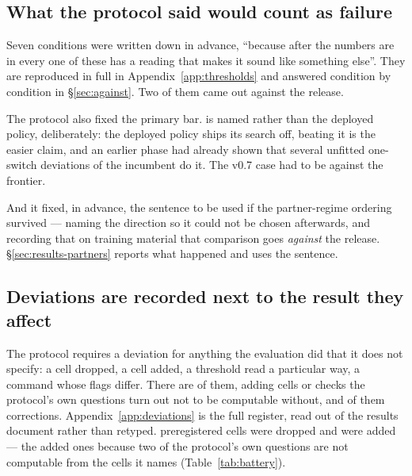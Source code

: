 \subsection{What the protocol said would count as failure}
\label{sec:protocol-failure}

Seven conditions were written down in advance, ``because after the numbers are in every one of these
has a reading that makes it sound like something else''. They are reproduced in full in
Appendix~\ref{app:thresholds} and answered condition by condition in \S\ref{sec:against}. Two of them
came out against the release.

The protocol also fixed the primary bar. \fcheap{} is named rather than the deployed policy,
deliberately: the deployed policy ships its search off, beating it is the easier claim, and an
earlier phase had already shown that several unfitted one-switch deviations of the incumbent do it.
The v0.7 case had to be against the frontier.

And it fixed, in advance, the sentence to be used if the partner-regime ordering survived --- naming
the direction so it could not be chosen afterwards, and recording that on training material that
comparison goes \emph{against} the release. \S\ref{sec:results-partners} reports what happened and
uses the sentence.

\subsection{Deviations are recorded next to the result they affect}
\label{sec:protocol-deviations}

The protocol requires a deviation for anything the evaluation did that it does not specify: a cell
dropped, a cell added, a threshold read a particular way, a command whose flags differ. There are
\vsevenDeviations{} of them, \vsevenDeviationAdded{} adding cells or checks the protocol's own
questions turn out not to be computable without, and \vsevenDeviationCorrections{} of them
corrections. Appendix~\ref{app:deviations} is the full register, read out of the results
document rather than retyped. \vsevenCellsDropped{} preregistered cells were dropped and
\vsevenCellsAdded{} were added --- the added ones because two of the protocol's own questions are not
computable from the cells it names (Table~\ref{tab:battery}).
